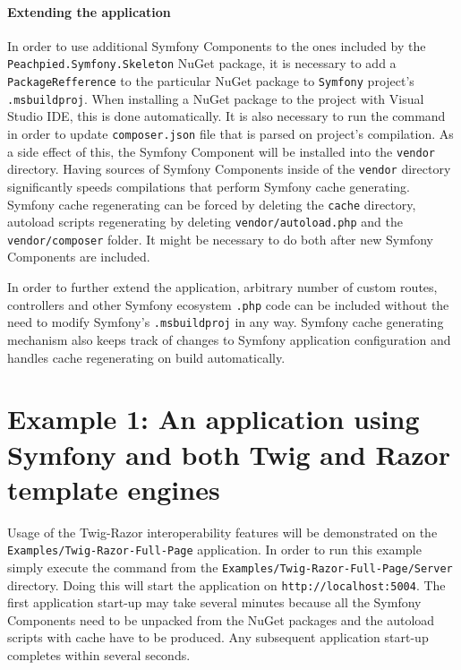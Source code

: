 \paragraph{Extending the application}
In order to use additional Symfony Components to the ones included by the \texttt{Peachpied.Symfony.Skeleton} NuGet package, it is necessary to add a \texttt{PackageRefference} to the particular NuGet package to \texttt{Symfony} project's \texttt{.msbuildproj}. When installing a NuGet package to the project with Visual Studio IDE, this is done automatically. It is also necessary to run the \noindent{} command in order to update \texttt{composer.json} file that is parsed on project's compilation. As a side effect of this, the Symfony Component will be installed into the \texttt{vendor} directory. Having sources of Symfony Components inside of the \texttt{vendor} directory significantly speeds compilations that perform Symfony cache generating. Symfony cache regenerating can be forced by deleting the \texttt{cache} directory, autoload scripts regenerating by deleting \texttt{vendor/autoload.php} and the \texttt{vendor/composer} folder. It might be necessary to do both after new Symfony Components are included.

In order to further extend the application, arbitrary number of custom routes, controllers and other Symfony ecosystem \texttt{.php} code can be included without the need to modify Symfony's \texttt{.msbuildproj} in any way. Symfony cache generating mechanism also keeps track of changes to Symfony application configuration and handles cache regenerating on build automatically.



\section{Example 1: An application using Symfony and both Twig and Razor template engines}
Usage of the Twig-Razor interoperability features will be demonstrated on the \texttt{Examples/Twig-Razor-Full-Page} application. In order to run this example simply execute the \noindent{} command from the \texttt{Examples/Twig-Razor-Full-Page/Server} directory. Doing this will start the application on \texttt{http://localhost:5004}. The first application start-up may take several minutes because all the Symfony Components need to be unpacked from the NuGet packages and the autoload scripts with cache have to be produced. Any subsequent application start-up completes within several seconds. 


